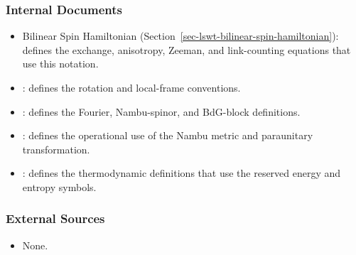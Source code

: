 \subsubsection{Internal Documents}

\begin{itemize}
\tightlist
\item
  Bilinear Spin Hamiltonian (Section~\ref{sec-lswt-bilinear-spin-hamiltonian}): defines the exchange, anisotropy, Zeeman, and link-counting equations that use this notation.
\item
  : defines the rotation and local-frame conventions.
\item
  : defines the Fourier, Nambu-spinor, and BdG-block definitions.
\item
  : defines the operational use of the Nambu metric and paraunitary transformation.
\item
  : defines the thermodynamic definitions that use the reserved energy and entropy symbols.
\end{itemize}

\subsubsection{External Sources}

\begin{itemize}
\tightlist
\item
  None.
\end{itemize}
